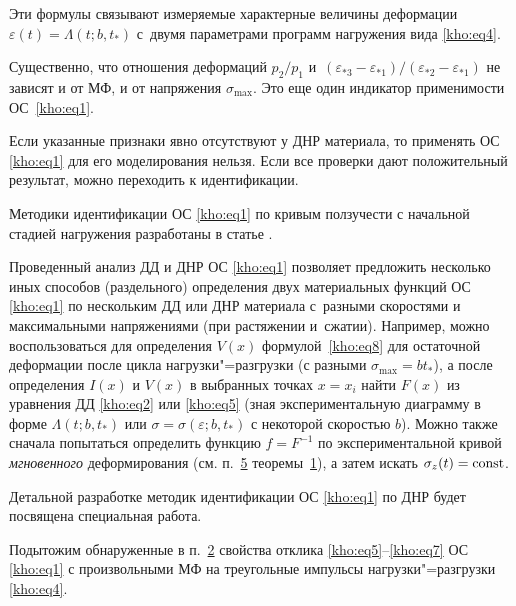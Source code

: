 Эти формулы связывают измеряемые характерные величины деформации $\varepsilon(t)=\Lambda(t;b,t_\ast)$ с~двумя параметрами программ нагружения вида \eqref{kho:eq4}. 

Существенно, что отношения деформаций $p_2/p_1$ и~$(\varepsilon_{\ast3}-\varepsilon_{\ast1})/(\varepsilon_{\ast2}-\varepsilon_{\ast1})$ не зависят и от МФ, и от напряжения $\sigma_{\max}$. Это еще один индикатор применимости ОС~\eqref{kho:eq1}. 



Если указанные признаки явно отсутствуют у ДНР материала, то применять ОС \eqref{kho:eq1} для его моделирования нельзя. Если все проверки дают положительный результат, можно переходить к идентификации. 

Методики идентификации ОС \eqref{kho:eq1} по кривым ползучести с начальной стадией нагружения разработаны в статье \cite{kho:bib8}. 

Проведенный анализ ДД и ДНР ОС \eqref{kho:eq1} позволяет предложить несколько иных способов (раздельного) определения двух материальных функций ОС \eqref{kho:eq1} по нескольким ДД или ДНР материала с~разными скоростями и максимальными напряжениями (при растяжении и~сжатии). Например, можно воспользоваться для определения $V(x)$ формулой~\eqref{kho:eq8} для остаточной деформации после цикла нагрузки"=разгрузки (с разными $\sigma_{\max}=bt_\ast$), а после определения $I(x)$ и $V(x)$ в выбранных точках $x=x_i$ найти $F(x)$ из уравнения ДД \eqref{kho:eq2} или \eqref{kho:eq5} (зная экспериментальную диаграмму в форме $\Lambda(t;b,t_\ast)$ или $\sigma=\sigma(\varepsilon;b,t_\ast)$ с некоторой скоростью $b$). Можно также сначала попытаться определить функцию $f=F^{-1}$ по экспериментальной кривой \textit{мгновенного} деформирования (см. п.~\hyperlink{kh:p5}{5} теоремы~\hyperlink{kh:th1}{1}), а затем искать $\sigma_z (t)={\rm const}$. 

Детальной разработке методик идентификации ОС \eqref{kho:eq1} по ДНР будет посвящена специальная работа.



Подытожим обнаруженные в п.~\hyperlink{kh:2OC}{2} свойства отклика \eqref{kho:eq5}--\eqref{kho:eq7} ОС \eqref{kho:eq1} с произвольными МФ на треугольные импульсы нагрузки"=разгрузки \eqref{kho:eq4}.



\smallskip









